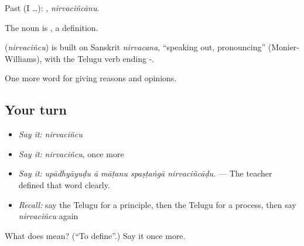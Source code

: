 Past (I …): , \emph{nirvaciñcānu}.

The noun is , a definition.

\begin{cousinweb}
\textbf{} (\emph{nirvaciñcu}) is built on Sanskrit \emph{nirvacana}, \textquotedblleft{}speaking out, pronouncing\textquotedblright{} (Monier-Williams), with the Telugu verb ending -.
\end{cousinweb}

\begin{grammarlens}[title={What you've built}]
One more word for giving reasons and opinions.
\end{grammarlens}

\subsection*{Your turn}
\begin{itemize}
\raggedright
  \item \emph{Say it:} \emph{nirvaciñcu}
  \item \emph{Say it:} \emph{nirvaciñcu}, once more
  \item \emph{Say it:} \emph{upādhyāyuḍu ā māṭanu spaṣṭaṅgā nirvaciñcāḍu.} — The teacher defined that word clearly.
  \item \emph{Recall:} say the Telugu for a principle, then the Telugu for a process, then say \emph{nirvaciñcu} again
\end{itemize}

\begin{tcolorbox}[breakable,colback=teal!4,colframe=teal!35!black,title={Before you move on}]
What does  mean? (\textquotedblleft{}To define\textquotedblright{}.) Say it once more.
\end{tcolorbox}
